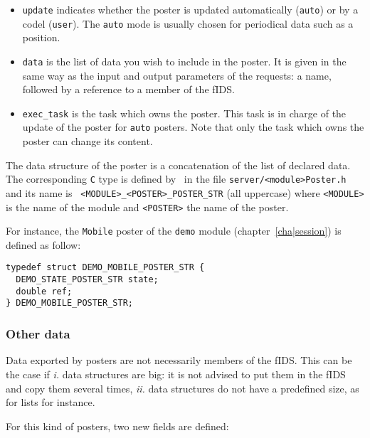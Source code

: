 \begin{itemize}
\item {\tt update} indicates whether the poster is updated automatically
({\tt auto}) or by  a codel ({\tt user}). The  {\tt auto} mode is usually
chosen for periodical data such as a position.

\item {\tt data} is the list of data you wish to include in the
poster. It is given in the same way as the input and output parameters of
the requests: a name, followed by a reference to a member of the fIDS.

\item {\tt exec\_task} is the task which owns the poster. This task is in
charge of the update of the poster for {\tt auto} posters. Note that only
the task which owns the poster can change its content.
\end{itemize}

The data  structure  of the  poster is  a concatenation  of  the  list of
declared data.  The corresponding  {\tt C} type  is defined by \GenoM\ in
the     file   {\tt  server/<module>Poster.h} and     its    name  is  {\tt
<MODULE>\_<POSTER>\_POSTER\_STR} (all uppercase) where {\tt <MODULE>} is the name
of the module and {\tt <POSTER>} the name of the poster.

For  instance,   the {\tt  Mobile}  poster  of    the {\tt  demo}  module
(chapter~\ref{cha|session}) is defined as follow:

\begin{center}\begin{cartouche}\small\begin{verbatim}
typedef struct DEMO_MOBILE_POSTER_STR {
  DEMO_STATE_POSTER_STR state;
  double ref;
} DEMO_MOBILE_POSTER_STR;
\end{verbatim}\end{cartouche}\end{center}


\subsubsection{Other data}

Data exported by posters  are not necessarily members  of the fIDS.  This
can be the case if {\em i.} data structures are big: it is not advised to
put  them in   the fIDS and   copy them  several times, {\em   ii.}  data
structures do not have a predefined size, as for lists for instance.

For this kind of posters, two new fields are defined:

